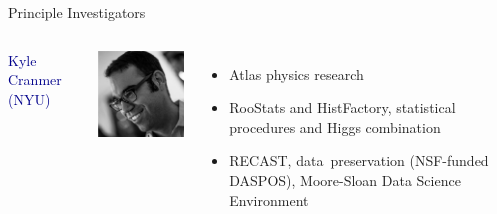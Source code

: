 \documentclass{beamer}
\begin{document}
\begin{frame}{Principle Investigators}
\begin{columns}[t]
\textcolor{darkblue}{Kyle Cranmer (NYU)}
\begin{columns}
\includegraphics[height=2 cm]{kyle_cranmer.png}
\begin{itemize}
\item Atlas physics research
\item RooStats and HistFactory, statistical procedures and Higgs combination
\item RECAST, \mbox{data preservation\hspace{-0.5 cm}} (NSF-funded DASPOS), Moore-Sloan Data Science Environment
\end{itemize}
\end{columns}
\end{columns}
\end{frame}
\end{document}
